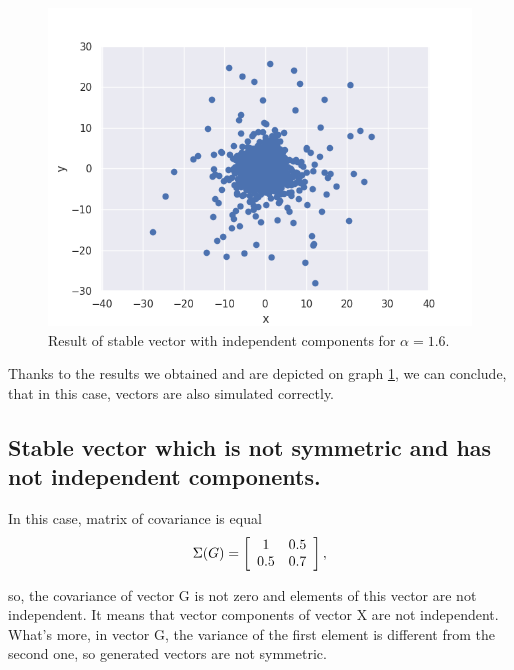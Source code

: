 \documentclass{article}
\begin{document}
	\begin{figure}[H]
		\centering
		\includegraphics[width=1\linewidth]{images/ex_1_b_alpha_stable_vector_simulation_symmetric_continous_scatter}
		\caption{Result of stable vector with independent components for $\alpha=1.6$.}\label{2}
	\end{figure}
	Thanks to the results we obtained and are depicted on graph \ref{2}, we can conclude, that in this case, vectors are also simulated correctly.
	
	\subsection{Stable vector which is not symmetric and has not independent components.}
	
	In this case, matrix of covariance is equal
	\begin{equation*}
		\Sigma(G) = \left[{\begin{array}{*{20}c}
			1 & 0.5\\
			0.5 & 0.7\end{array} } \right],
	\end{equation*}

	so, the covariance of vector G is not zero and elements of this vector are not independent. It means that vector components of vector X are not independent. What's more, in vector G, the variance of the first element is different from the second one, so generated vectors are not symmetric.
	
\end{document}
